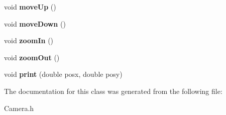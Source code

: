 \begin{DoxyCompactItemize}
\mbox{\label{class_camera_aa6dc57f7ed60e5bfc106d48c7431c8c1}} 
void {\bfseries move\+Up} ()
\item 
\mbox{\label{class_camera_ab8c429b8547f3a106657ecd07dffc5bc}} 
void {\bfseries move\+Down} ()
\item 
\mbox{\label{class_camera_a62d35e87b3eeac9463f43c17b65ef090}} 
void {\bfseries zoom\+In} ()
\item 
\mbox{\label{class_camera_aafc1d985053e11bd553b8a12540a562d}} 
void {\bfseries zoom\+Out} ()
\item 
\mbox{\label{class_camera_a6398913886565e782098849fcd3cffe5}} 
void {\bfseries print} (double posx, double posy)
\end{DoxyCompactItemize}


The documentation for this class was generated from the following file\+:\begin{DoxyCompactItemize}
\item 
Camera.\+h\end{DoxyCompactItemize}
